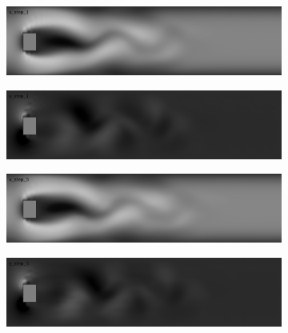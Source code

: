 \documentclass{llncs}
\begin{document}
\begin{figure}[H]
  \begin{subfigure}{.5\textwidth}
    \centering
    \includegraphics[width=1\linewidth]{imgs/sims/fluid/x_step_1}  
  \end{subfigure}
  \begin{subfigure}{.5\textwidth}
    \centering
    \includegraphics[width=1\linewidth]{imgs/sims/fluid/y_step_1}  
  \end{subfigure}

  \begin{subfigure}{.5\textwidth}
    \centering
    \includegraphics[width=1\linewidth]{imgs/sims/fluid/x_step_5}  
  \end{subfigure}
  \begin{subfigure}{.5\textwidth}
    \centering
    \includegraphics[width=1\linewidth]{imgs/sims/fluid/y_step_5}  
  \end{subfigure}


\end{figure}
\end{document}
